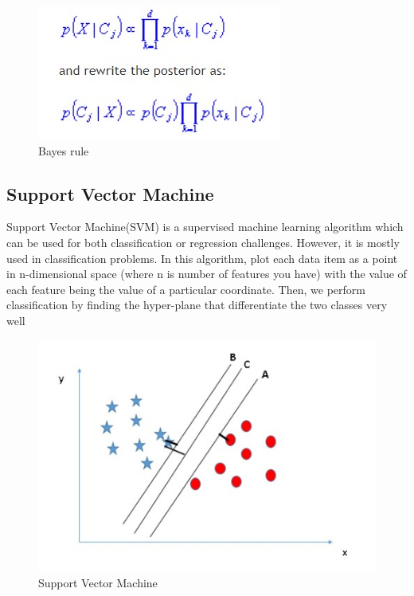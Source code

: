 \begin{figure}[h]
	\label{ss}    %
	\centering
	\includegraphics[width= 11 cm]{bayers2.jpg}
	\caption{Bayes rule }
\end{figure}

\pagebreak

\subsection{Support Vector Machine}


Support Vector Machine(SVM) is a supervised machine learning algorithm which can be used for both classification or regression challenges. However,  it is mostly used in classification problems. In this algorithm, plot each data item as a point in n-dimensional space (where n is number of features you have) with the value of each feature being the value of a particular coordinate. Then, we perform classification by finding the hyper-plane that differentiate the two classes very well 


\begin{figure}[h]
	\label{ss}    %
	\centering
	\includegraphics[width= 11 cm]{svm1.jpg}
	\caption{Support Vector Machine }
\end{figure}	

